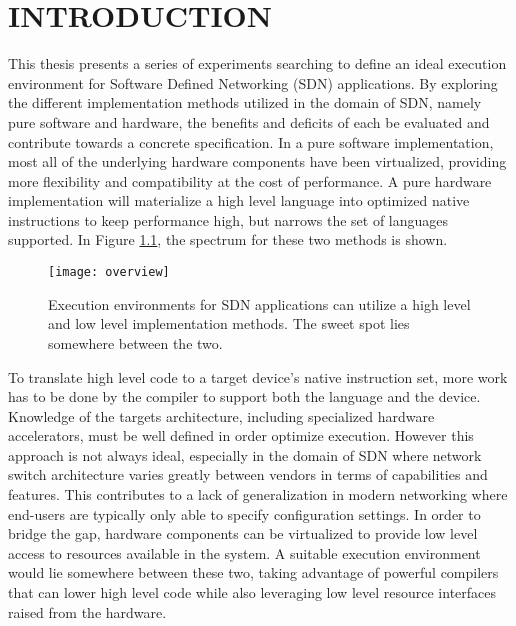 \chapter{INTRODUCTION}
\label{intro}

This thesis presents a series of experiments searching to define an ideal
execution environment for Software Defined Networking (SDN) applications. By
exploring the different implementation methods utilized in the domain of SDN,
namely pure software and hardware, the benefits and deficits of each be
evaluated and contribute towards a concrete specification. In a pure software
implementation, most all of the underlying hardware components have been
virtualized, providing more flexibility and compatibility at the cost of
performance. A pure hardware implementation will materialize a high level
language into optimized native instructions to keep performance high, but
narrows the set of languages supported. In Figure \ref{overview}, the spectrum
for these two methods is shown.

\begin{figure}[h]
\centering
\texttt{[image: overview]}
\caption{Execution environments for SDN applications can utilize a high level
and low level implementation methods. The sweet spot lies somewhere between
the two.}
\label{overview}
\end{figure}

To translate high level code to a target device's native instruction set, more
work has to be done by the compiler to support both the language and the
device. Knowledge of the targets architecture, including specialized hardware
accelerators, must be well defined in order optimize execution. However this
approach is not always ideal, especially in the domain of SDN where network
switch architecture varies greatly between vendors in terms of capabilities
and features. This contributes to a lack of generalization in modern networking
where end-users are typically only able to specify configuration settings. In
order to bridge the gap, hardware components can be virtualized to provide
low level access to resources available in the system. A suitable execution
environment would lie somewhere between these two, taking advantage of powerful
compilers that can lower high level code while also leveraging low level
resource interfaces raised from the hardware.

